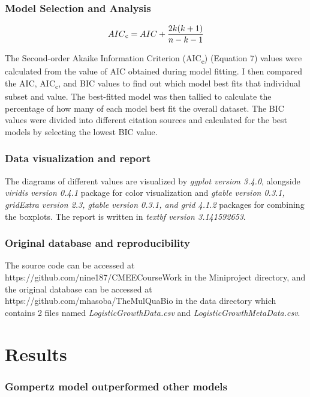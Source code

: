 \documentclass[11pt]{article}
\begin{document}
  \subsubsection*{Model Selection and Analysis}
  \begin{equation}
    AIC\textsubscript{c} = AIC + \frac{2k(k + 1)}{n - k - 1}
  \end{equation}

  \noindent The Second-order Akaike Information Criterion (AIC\textsubscript{c}) (Equation 7) values were calculated from the value of AIC obtained during model fitting.
  I then compared the AIC, AIC\textsubscript{c}, and BIC values to find out which model best fits that individual subset and value.
  The best-fitted model was then tallied to calculate the percentage of how many of each model best fit the overall dataset.
  The BIC values were divided into different citation sources and calculated for the best models by selecting the lowest BIC value. 
  \subsubsection*{Data visualization and report}
  The diagrams of different values are visualized by \textit{ggplot version 3.4.0}, alongside \textit{viridis version 0.4.1} package for color visualization and \textit{gtable version 0.3.1, gridExtra version 2.3, gtable version 0.3.1, and grid 4.1.2} packages for combining the boxplots.
  The report is written in \textit{textbf version 3.141592653}.

  \subsubsection*{Original database and reproducibility}
  The source code can be accessed at https://github.com/nine187/CMEECourseWork in the Miniproject directory, and the original database can be accessed at 
  \newline https://github.com/mhasoba/TheMulQuaBio in the data directory which contains 2 files named \textit{LogisticGrowthData.csv} and \textit{LogisticGrowthMetaData.csv}. 

  \section{Results}

  \subsubsection*{Gompertz model outperformed other models}
  
\end{document}
